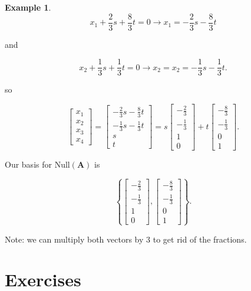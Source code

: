 \documentclass[
]{book}
\theoremstyle{definition}
\theoremstyle{definition}
\newtheorem{example}{Example}[chapter]
\theoremstyle{definition}
\theoremstyle{definition}
\theoremstyle{remark}
\begin{document}
\begin{examplebox}
\begin{example}
\[x_1+\frac{2}{3}s+\frac{8}{3}t=0\to x_1=-\frac{2}{3}s-\frac{8}{3}t\]

and

\[x_2+\frac13s+\frac13t=0\to x_2=x_2=-\frac13s-\frac13t.\]

so

\[\begin{bmatrix}x_1\\x_2\\x_3\\x_4\end{bmatrix}=\begin{bmatrix}-\frac{2}{3}s-\frac{8}{3}t\\-\frac13s-\frac13t\\s\\t\end{bmatrix}=s\begin{bmatrix}-\frac23\\-\frac13\\1\\0\end{bmatrix}+t\begin{bmatrix}-\frac83\\-\frac13\\0\\1\end{bmatrix}.\]

Our basis for \(\text{Null}(\mathbf{A})\) is

\[\left\{\begin{bmatrix}-\frac23\\-\frac13\\1\\0\end{bmatrix},\begin{bmatrix}-\frac83\\-\frac13\\0\\1\end{bmatrix}\right\}.\]

Note: we can multiply both vectors by 3 to get rid of the fractions.
\end{example}

\end{examplebox}

\section{Exercises}\label{exercises-1}
\end{document}
